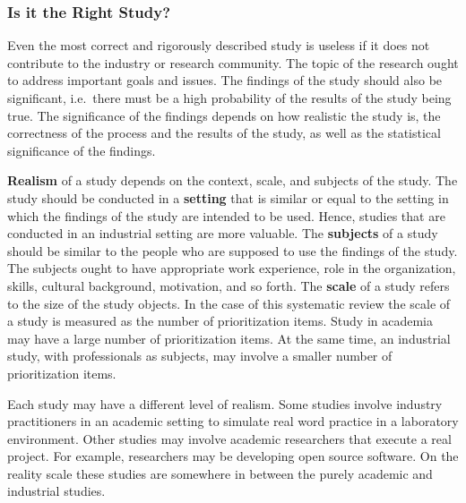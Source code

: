 \subsubsection{Is it the Right Study?}

Even the most correct and rigorously described study is useless if it does not contribute to the industry or research community. The topic of the research ought to address important goals and issues. The findings of the study should also be significant, i.e.\ there must be a high probability of the results of the study being true. The significance of the findings depends on how realistic the study is, the correctness of the process and the results of the study, as well as the statistical significance of the findings.

\textbf{Realism} of a study depends on the context, scale, and subjects of the study.
The study should be conducted in a \textbf{setting} that is similar or equal to the setting in which the findings of the study are intended to be used. Hence, studies that are conducted in an industrial setting are more valuable.
The \textbf{subjects} of a study should be similar to the people who are supposed to use the findings of the study. The subjects ought to have appropriate work experience, role in the organization, skills, cultural background, motivation, and so forth.
The \textbf{scale} of a study refers to the size of the study objects. 
In the case of this systematic review the scale of a study is measured as the number of prioritization items.
Study in academia may have a large number of prioritization items. At the same time, an industrial study, with professionals as subjects, may involve a smaller number of prioritization items.

Each study may have a different level of realism. Some studies involve industry practitioners in an academic setting to simulate real word practice in a laboratory environment.
Other studies may involve academic researchers that execute a real project. For example, researchers may be developing open source software.
On the reality scale these studies are somewhere in between the purely academic and industrial studies.


